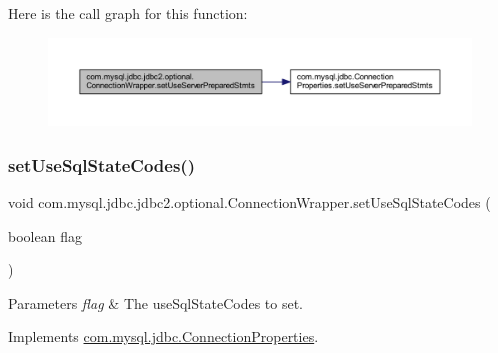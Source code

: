 Here is the call graph for this function\+:
\nopagebreak
\begin{figure}[H]
\begin{center}
\leavevmode
\includegraphics[width=350pt]{classcom_1_1mysql_1_1jdbc_1_1jdbc2_1_1optional_1_1_connection_wrapper_a87cc13b16614e7a9ab998e64518d35bd_cgraph}
\end{center}
\end{figure}
\mbox{\label{classcom_1_1mysql_1_1jdbc_1_1jdbc2_1_1optional_1_1_connection_wrapper_a5a221de19389e4c32fffb7532d8816ff}} 
\subsubsection{\texorpdfstring{set\+Use\+Sql\+State\+Codes()}{setUseSqlStateCodes()}}
{\footnotesize\ttfamily void com.\+mysql.\+jdbc.\+jdbc2.\+optional.\+Connection\+Wrapper.\+set\+Use\+Sql\+State\+Codes (\begin{DoxyParamCaption}\item[{boolean}]{flag }\end{DoxyParamCaption})}


\begin{DoxyParams}{Parameters}
{\em flag} & The use\+Sql\+State\+Codes to set. \\
\hline
\end{DoxyParams}


Implements \mbox{\hyperlink{interfacecom_1_1mysql_1_1jdbc_1_1_connection_properties_a479e40c9b5781e950ec3fca32646964b}{com.\+mysql.\+jdbc.\+Connection\+Properties}}.

